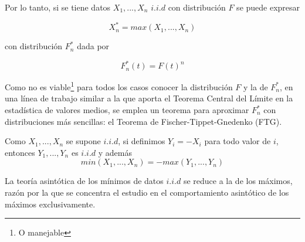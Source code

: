 \documentclass[
  12pt]{article}
\begin{document}
Por lo tanto, si se tiene datos \(X_1,...,X_n\) \(i.i.d\) con
distribución \(F\) se puede expresar

\begin{equation}
X_n^* = max (X_1,...,X_n)
\end{equation}

con distribución \(F_n^*\) dada por

\begin{equation}
F_n^* (t)= F(t)^n
\end{equation}

Como no es viable\footnote{O manejable} para todos los casos conocer la
distribución \(F\) y la de \(F_n^*\), en una línea de trabajo similar a
la que aporta el Teorema Central del Límite en la estadística de valores
medios, se emplea un teorema para aproximar \(F_n^{*}\) con
distribuciones más sencillas: el Teorema de Fischer-Tippet-Gnedenko
(FTG).

\begin{mydefinition}
Como $X_1,...,X_n$ se supone $i.i.d$, si definimos 
$Y_i = -X_i$ para todo valor de $i$, entonces $Y_1,...,Y_n$ es $i.i.d$ y
además
\begin{equation}
min(X_1,...,X_n) = - max(Y_1,...,Y_n)
\end{equation}
\end{mydefinition}

La teoría asintótica de los mínimos de datos \(i.i.d\) se reduce a la de
los máximos, razón por la que se concentra el estudio en el
comportamiento asintótico de los máximos exclusivamente.
\end{document}
